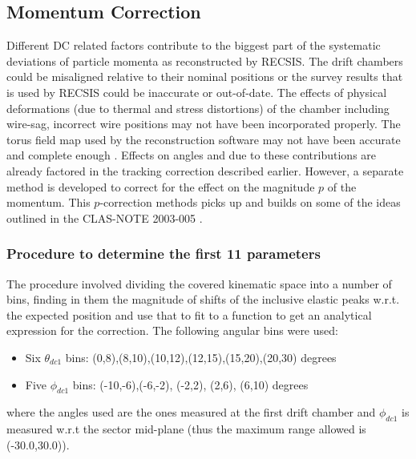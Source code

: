 

\subsection{Momentum Correction}
Different DC related factors contribute to the biggest part of the systematic deviations of particle momenta as reconstructed by RECSIS. The drift chambers could be misaligned relative to their nominal positions or the survey results that is used by RECSIS could be inaccurate or out-of-date. The effects of physical deformations (due to thermal and stress distortions) of the chamber including wire-sag, incorrect wire positions may not have been incorporated properly. The torus field map used by the reconstruction software may not have been accurate and complete enough \cite{e6momcor_cn}. Effects on angles \th and \ph due to these contributions are already factored in the tracking correction described earlier. However, a separate method is developed to correct for the effect on the magnitude $p$ of the momentum. This $p$-correction methods picks up and builds on some of the ideas outlined in the CLAS-NOTE 2003-005 \cite{e6momcor_cn}.

\subsubsection{Procedure to determine the first 11 parameters}
\label{pCorFit1}
The procedure involved dividing the covered kinematic space into a number of bins, finding in them the magnitude of shifts of the inclusive 
elastic peaks w.r.t. the expected position and use that to fit to a function to get an analytical expression for the correction. The 
following angular bins were used:
\begin{itemize}
\item Six $\theta_{dc1}$ bins: (0,8),(8,10),(10,12),(12,15),(15,20),(20,30) degrees
\item Five $\phi_{dc1}$ bins: (-10,-6),(-6,-2), (-2,2), (2,6), (6,10) degrees 
\end{itemize}
where the angles used are the ones measured at the first drift chamber and $\phi_{dc1}$ is measured w.r.t the sector mid-plane (thus the 
maximum range allowed is (-30.0,30.0)).
  

